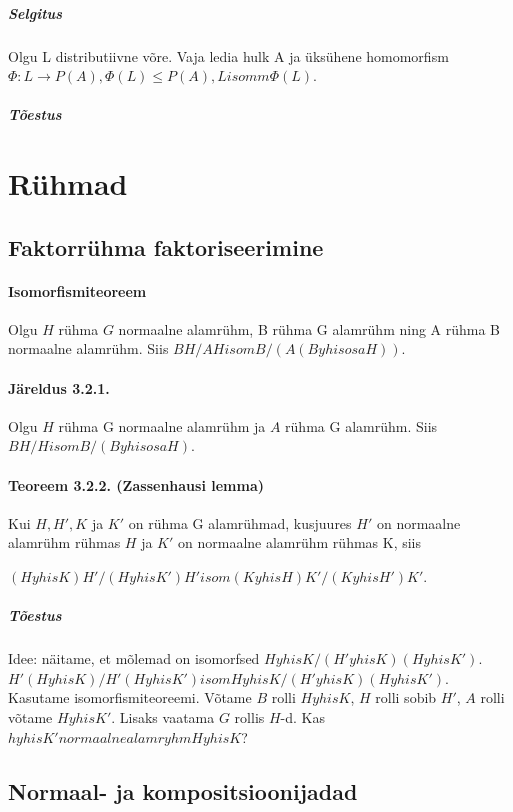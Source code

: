 \documentclass[12pt]{report}
\numberwithin{equation}{section}
\theoremstyle{definition}
\theoremstyle{plain}
\begin{document}
\subparagraph{Selgitus}
Olgu L distributiivne võre. Vaja ledia hulk A ja \"uks\"uhene homomorfism $\Phi : L \rightarrow P(A), \Phi(L) \leq P(A), L isomm \Phi(L)$. 

\subparagraph{Tõestus}

\section{R\"uhmad}

\subsection{Faktorr\"uhma faktoriseerimine}

\paragraph{Isomorfismiteoreem}
Olgu $H$ rühma $G$ normaalne alamr\"uhm, B r\"uhma G alamr\"uhm ning A r\"uhma B normaalne alamr\"uhm. Siis $BH/AH isom B/(A(B yhisosa H))$.

\paragraph{Järeldus 3.2.1.}
Olgu $H$ r\"uhma G normaalne alamr\"uhm ja $A$ r\"uhma G alamr\"uhm. Siis $BH/H isom B/(B yhisosa H)$.

\paragraph{Teoreem 3.2.2. (Zassenhausi lemma)}
Kui $H,H',K$ ja $K'$ on rühma G alamrühmad, kusjuures $H'$ on normaalne alamr\"uhm r\"uhmas $H$ ja $K'$ on normaalne alamr\"uhm r\"uhmas K, siis

$(H yhis K)H'/(H yhis K')H' isom (K yhis H)K'/(K yhis H')K'$.

\subparagraph{Tõestus}

Idee: näitame, et mõlemad on isomorfsed $H yhis K / (H' yhis K)(H yhis K')$.
$H'(H yhis K) / H'(H yhis K') isom H yhis K / (H' yhis K)(H yhis K')$.
Kasutame isomorfismiteoreemi. Võtame $B$ rolli $H yhis K$, $H$ rolli sobib  $H'$, $A$ rolli võtame $H yhis K'$. Lisaks vaatama $G$ rollis $H$-d. Kas $h yhis K' normaalne alamryhm H yhis K$?

\subsection{Normaal- ja kompositsioonijadad}
\end{document}
